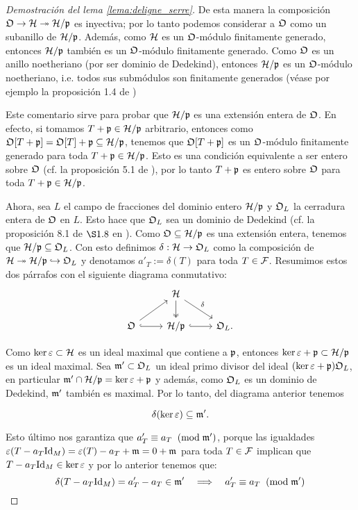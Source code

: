 \begin{proof}[Demostraci\'on del lema \ref{lema:deligne_serre}]
  De esta manera la composici\'on $\mathfrak{O}\rightarrow\mathcal{H}\twoheadrightarrow\mathcal{H}/\mathfrak{p}$ es inyectiva; por lo tanto podemos considerar a $\mathfrak{O}$ como un subanillo de $\mathcal{H}/\mathfrak{p}$. Adem\'as, como $\mathcal{H}$ es un $\mathfrak{O}$-m\'odulo finitamente generado, entonces $\mathcal{H}/\mathfrak{p}$ tambi\'en es un $\mathfrak{O}$-m\'odulo finitamente generado. Como $\mathfrak{O}$ es un anillo noetheriano (por ser dominio de Dedekind), entonces $\mathcal{H}/\mathfrak{p}$ es un $\mathfrak{O}$-m\'odulo noetheriano, i.e. todos sus subm\'odulos son finitamente generados (v\'ease por ejemplo la proposici\'on 1.4 de \cite{EisenbudCA})

  Este comentario sirve para probar que $\mathcal{H}/\mathfrak{p}$ es una extensi\'on entera de $\mathfrak{O}$. En efecto, si tomamos $T+\mathfrak{p}\in\mathcal{H}/\mathfrak{p}$ arbitrario, entonces como $\mathfrak{O}[T+\mathfrak{p}]=\mathfrak{O}[T]+\mathfrak{p}\subseteq\mathcal{H}/\mathfrak{p}$, tenemos que $\mathfrak{O}[T+\mathfrak{p}]$ es un $\mathfrak{O}$-m\'odulo finitamente generado para toda $T+\mathfrak{p}\in\mathcal{H}/\mathfrak{p}$. Esto es una condici\'on equivalente a ser entero sobre $\mathfrak{O}$  (cf. la proposici\'on 5.1 de \cite{AtiyahCA}), por lo tanto $T+\mathfrak{p}$ es entero sobre $\mathfrak{O}$ para toda $T+\mathfrak{p}\in\mathcal{H}/\mathfrak{p}$.

  Ahora, sea $L$ el campo de fracciones del dominio entero $\mathcal{H}/\mathfrak{p}$ y $\mathfrak{O}_L$ la cerradura entera de $\mathfrak{O}$ en $L$. Esto hace que $\mathfrak{O}_L$ sea un dominio de Dedekind (cf. la proposici\'on 8.1 de $\S1.8$ en \cite{NeukirchANT}). Como $\mathfrak{O}\subseteq\mathcal{H}/\mathfrak{p}$ es una extensi\'on entera, tenemos que $\mathcal{H}/\mathfrak{p}\subseteq\mathfrak{O}_L$. Con esto definimos $\delta:\mathcal{H}\rightarrow\mathfrak{O}_L$ como la composici\'on de $\mathcal{H}\twoheadrightarrow\mathcal{H}/\mathfrak{p}\hookrightarrow\mathfrak{O}_L$ y denotamos $a'_T:=\delta(T)$ para toda $T\in\mathcal{F}$. Resumimos estos dos p\'arrafos con el siguiente diagrama conmutativo:
  \[
    \begin{tikzcd}
      &\Hh \arrow[d,two heads] \arrow[dr,"\delta"]&\\
      \fO \arrow[ur] \arrow[r,hook] & \Hh/\p \arrow[r,hook] & \fO_L.
    \end{tikzcd}
  \]

  Como $\ker\varepsilon\subset\mathcal{H}$ es un ideal maximal que contiene a $\mathfrak{p}$, entonces $\ker\varepsilon+\mathfrak{p}\subset\mathcal{H}/\mathfrak{p}$ es un ideal maximal. Sea $\mathfrak{m}'\subset\mathfrak{O}_L$ un ideal primo divisor del ideal $(\ker\varepsilon+\mathfrak{p})\mathfrak{O}_L$, en particular $\mathfrak{m}'\cap\mathcal{H}/\mathfrak{p}=\ker\varepsilon+\mathfrak{p}$ y adem\'as, como $\mathfrak{O}_L$ es un dominio de Dedekind, $\mathfrak{m}'$ tambi\'en es maximal. Por lo tanto, del diagrama anterior tenemos
  
  \begin{equation}\label{eq:contraccion_m}
	\delta(\ker\varepsilon)\subseteq\mathfrak{m}'.  
  \end{equation}

  Esto \'ultimo nos garantiza que $a'_T\equiv a_T\;\;(\mathrm{mod}\; \mathfrak{m}')$, porque las igualdades $\varepsilon(T-a_T\mathrm{Id}_M)=\varepsilon(T)-a_T+\mathfrak{m}=0+\mathfrak{m}$ para toda $T\in\mathcal{F}$ implican que $T-a_T\mathrm{Id}_M\in\ker\varepsilon$ y por lo anterior tenemos que:
  \begin{equation}\label{eqn:eigenvalorescoincidenmodm}
    \delta(T-a_T\mathrm{Id}_M)=a'_T-a_T\in\mathfrak{m}' \quad\Longrightarrow\quad a'_T\equiv a_T\;\;(\mathrm{mod}\; \mathfrak{m}')
  \end{equation}
 

\end{proof}
